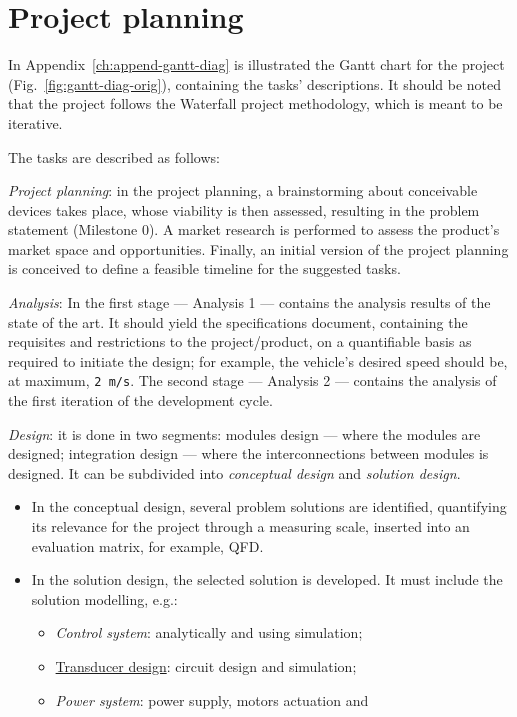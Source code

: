 \section{Project planning}
\label{sec:project-planning}
In Appendix~\ref{ch:append-gantt-diag} is illustrated the Gantt chart for the
project (Fig.~\ref{fig:gantt-diag-orig}), containing the tasks' descriptions. It
should be noted that the project follows the Waterfall project
methodology, which is meant to be iterative.

The tasks are described as follows:
\begin{item-c}
\item \emph{Project planning}: in the project planning, a brainstorming about conceivable devices takes place, whose
viability is then assessed, resulting in the problem statement
(Milestone 0). A market research is performed to assess the product's market
space and opportunities. Finally, an initial version of the project planning is
conceived to define a feasible timeline for the suggested tasks.
\item \emph{Analysis}: In the first stage --- Analysis 1 --- contains the analysis
results of the state of the art. It should yield the specifications document,
containing the requisites and restrictions to the project/product, on a
quantifiable basis as required to initiate the design; for example, the
vehicle's desired speed should be, at maximum, \texttt{2 m/s}. The second stage --- Analysis 2
--- contains the analysis of the first iteration of the development cycle.
\item \emph{Design}: it is done in two segments: modules design --- where the modules are
designed; integration design --- where the interconnections between modules is
designed. It can be subdivided into \emph{conceptual design} and \emph{solution
design}. 
\begin{itemize}
\item In the conceptual design, several problem solutions are identified,
quantifying its relevance for the project through a measuring scale,
inserted into an evaluation matrix, for example, QFD.%
\item In the solution design, the selected solution is developed. It must include
the solution modelling, e.g.:
\begin{itemize}
\item \emph{Control system}: analytically and using simulation;
\item \underline{Transducer design}: circuit design and simulation;
\item \emph{Power system}: power supply, motors actuation and

\end{itemize}
\end{itemize}
\end{item-c}
